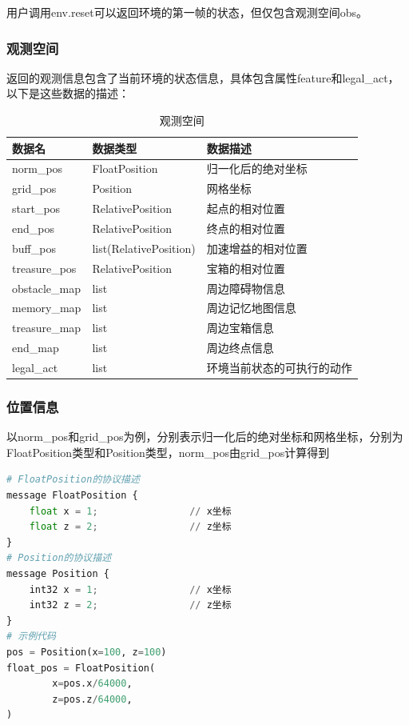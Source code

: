 用户调用env.reset可以返回环境的第一帧的状态，但仅包含观测空间obs。

\subsubsection{观测空间}

 返回的观测信息包含了当前环境的状态信息，具体包含属性feature和legal\_act，以下是这些数据的描述：

\begin{table}[H]
    \begin{tabularx}{1\textwidth}{l l X } %
        \hline %
        \textbf{数据名} & \textbf{数据类型} & \textbf{数据描述}  \\
        \hline
        norm\_pos&FloatPosition&归一化后的绝对坐标\\
        grid\_pos&Position&网格坐标\\
        start\_pos&RelativePosition&起点的相对位置\\
        end\_pos&RelativePosition&终点的相对位置\\
        buff\_pos&list(RelativePosition)&加速增益的相对位置\\
        treasure\_pos&RelativePosition&宝箱的相对位置\\
        obstacle\_map&list&周边障碍物信息\\
        memory\_map&list&周边记忆地图信息\\
        treasure\_map&list&周边宝箱信息\\
        end\_map&list&周边终点信息\\
        legal\_act&list&环境当前状态的可执行的动作        \\
        \hline
    \end{tabularx}

    \centering
    \caption{观测空间}
    \label{measure-space}
\end{table}

\subsubsection{位置信息}

以norm\_pos和grid\_pos为例，分别表示归一化后的绝对坐标和网格坐标，分别为FloatPosition类型和Position类型，norm\_pos由grid\_pos计算得到

\begin{lstlisting}[language=Python]
# FloatPosition的协议描述
message FloatPosition {
    float x = 1;                // x坐标
    float z = 2;                // z坐标
}
# Position的协议描述
message Position {
    int32 x = 1;                // x坐标
    int32 z = 2;                // z坐标
}
# 示例代码
pos = Position(x=100, z=100)
float_pos = FloatPosition(
        x=pos.x/64000,
        z=pos.z/64000,
)
\end{lstlisting}

